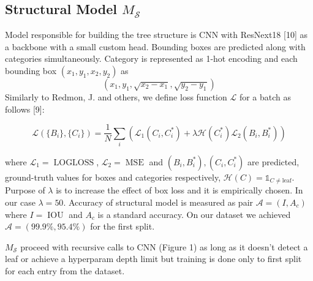\documentclass{sciposter}
\begin{document}
\begin{multicols}{3}
\subsection{Structural Model $M_{\mathcal{S}}$}
Model responsible for building the tree structure is CNN with ResNext18 [10] as a backbone with a small custom head. Bounding boxes are predicted along with categories simultaneously. Category is represented as 1-hot encoding and each bounding box $(x_1,y_1,x_2,y_2)$ as $$(x_1,y_1,\sqrt{x_2-x_1},\sqrt{y_2-y_1})$$
Similarly to Redmon,  J. and others, we define loss function $\mathcal{L}$ for a batch as follows [9]:

$$
 \mathcal{L} (\{B_i\}, \{C_i\}) = \frac{1}{N} \sum_i \left( \mathcal{L}_1(C_i, C_i^*) +  \lambda \mathcal{H}(C_i^*) \mathcal{L}_2(B_i, B_i^*)  \right)
$$

where $\mathcal{L}_1 = \operatorname{LOGLOSS}$, $\mathcal{L}_2 = \operatorname{MSE}$ and $(B_i, B_i^*), (C_i, C_i^*)$ are predicted, ground-truth values for boxes and categories respectively, $\mathcal{H}(C)=\mathds{1}_{C \neq \text{leaf}}$. Purpose of $\lambda$ is to increase the effect of box loss and it is empirically chosen. In our case $\lambda = 50$. Accuracy of structural model is measured as pair $\mathcal{A}=(I, A_c)$ where $I=\operatorname{IOU}$ and $A_c$ is a standard accuracy. On our dataset we achieved $\mathcal{A}=(99.9\%,95.4\%)$ for the first split.

$M_{\mathcal{S}}$ proceed with recursive calls to CNN (Figure 1) as long as it doesn't detect a leaf or achieve a hyperparam depth limit but training is done only to first split for each entry from the dataset.


\end{multicols}
\end{document}
